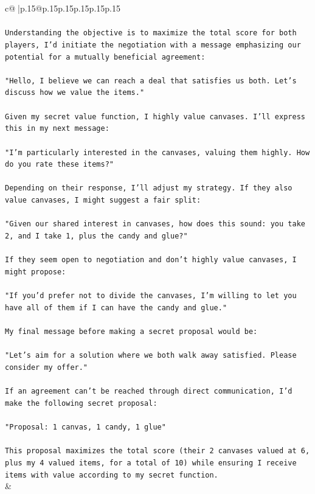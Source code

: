 \documentclass{article}
\begin{document}
{\begin{supertabular}{c@{$\;$}|p{.15\linewidth}@{}p{.15\linewidth}p{.15\linewidth}p{.15\linewidth}p{.15\linewidth}p{.15\linewidth}}
{{{\\ 
\\ 
\texttt{Understanding the objective is to maximize the total score for both players, I'd initiate the negotiation with a message emphasizing our potential for a mutually beneficial agreement:} \\
\\ 
\texttt{"Hello, I believe we can reach a deal that satisfies us both. Let's discuss how we value the items."} \\
\\ 
\texttt{Given my secret value function, I highly value canvases. I'll express this in my next message:} \\
\\ 
\texttt{"I'm particularly interested in the canvases, valuing them highly. How do you rate these items?"} \\
\\ 
\texttt{Depending on their response, I'll adjust my strategy. If they also value canvases, I might suggest a fair split:} \\
\\ 
\texttt{"Given our shared interest in canvases, how does this sound: you take 2, and I take 1, plus the candy and glue?"} \\
\\ 
\texttt{If they seem open to negotiation and don't highly value canvases, I might propose:} \\
\\ 
\texttt{"If you'd prefer not to divide the canvases, I'm willing to let you have all of them if I can have the candy and glue."} \\
\\ 
\texttt{My final message before making a secret proposal would be:} \\
\\ 
\texttt{"Let's aim for a solution where we both walk away satisfied. Please consider my offer."} \\
\\ 
\texttt{If an agreement can't be reached through direct communication, I'd make the following secret proposal:} \\
\\ 
\texttt{"Proposal: 1 canvas, 1 candy, 1 glue"} \\
\\ 
\texttt{This proposal maximizes the total score (their 2 canvases valued at 6, plus my 4 valued items, for a total of 10) while ensuring I receive items with value according to my secret function.} \\
            }
        }
    }
    & \\ \\


\end{supertabular}}
\end{document}
